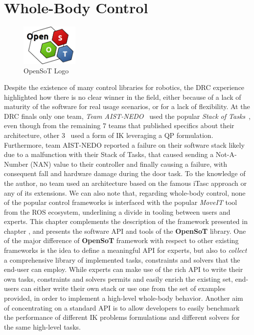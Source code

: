 \section{Whole-Body Control}
\begin{figure}
  \begin{center}
    \includegraphics[width=0.25\textwidth]{images/openSoT_stickers}
  \end{center}
  \caption{OpenSoT Logo}
\end{figure}
Despite the existence of many control libraries for robotics, the DRC experience highlighted how there is no clear winner in the field, either because of a lack of maturity of the software for real usage scenarios, or for a lack of flexibility. At the DRC finals only one team, \emph{Team AIST-NEDO}~\cite{Cisneros:15} used the popular \emph{Stack of Tasks}~\cite{mansard:icar:09, A-KanLamWie11}, even though from the remaining  7 teams that published specifics about their architecture, other 3~\cite{hopkins:15, Feng2015-ru, ihmc_whole_body}  used a form of IK leveraging a QP formulation. Furthermore, team AIST-NEDO reported a failure on their software stack likely due to a malfunction with their Stack of Tasks, that caused sending a Not-A-Number (NAN) value to their controller and finally causing a failure, with consequent fall and hardware damage during the door task. To the knowledge of the author, no team used an architecture based on the famous iTasc approach \cite{De_Schutter2007-to} or any of its extensions. We can also note that, regarding whole-body control, none of the popular control frameworks is interfaced with the popular \emph{MoveIT} tool from the ROS ecosystem, underlining a divide in tooling between users and experts.
This chapter complements the description of the framework presented in chapter \cite{sec:opensot-library}, and presents the software API and tools of the \textbf{OpenSoT} library. 
One of the major difference of \textbf{OpenSoT} framework with respect to other existing frameworks is the idea to define a meaningful API for experts, but also to \emph{collect} a comprehensive library of implemented tasks, constraints and solvers that the end-user can employ. While experts can make use of the rich API to write their own tasks, constraints and solvers permits and easily enrich the existing set, end-users can either write their own stack or use one from the set of examples provided, in order to implement a high-level whole-body behavior. Another aim of concentrating on a standard API is to allow developers to easily benchmark the performance of different IK problems formulations and different solvers for the same high-level tasks.

